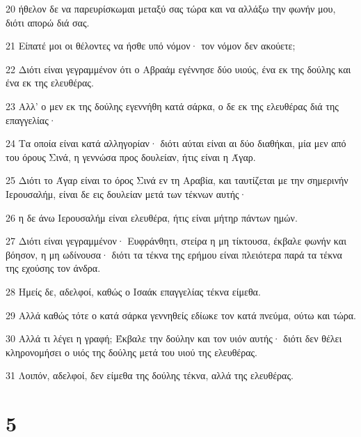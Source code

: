 \par 20 ήθελον δε να παρευρίσκωμαι μεταξύ σας τώρα και να αλλάξω την φωνήν μου, διότι απορώ διά σας.
\par 21 Είπατέ μοι οι θέλοντες να ήσθε υπό νόμον· τον νόμον δεν ακούετε;
\par 22 Διότι είναι γεγραμμένον ότι ο Αβραάμ εγέννησε δύο υιούς, ένα εκ της δούλης και ένα εκ της ελευθέρας.
\par 23 Αλλ' ο μεν εκ της δούλης εγεννήθη κατά σάρκα, ο δε εκ της ελευθέρας διά της επαγγελίας·
\par 24 Τα οποία είναι κατά αλληγορίαν· διότι αύται είναι αι δύο διαθήκαι, μία μεν από του όρους Σινά, η γεννώσα προς δουλείαν, ήτις είναι η Άγαρ.
\par 25 Διότι το Άγαρ είναι το όρος Σινά εν τη Αραβία, και ταυτίζεται με την σημερινήν Ιερουσαλήμ, είναι δε εις δουλείαν μετά των τέκνων αυτής·
\par 26 η δε άνω Ιερουσαλήμ είναι ελευθέρα, ήτις είναι μήτηρ πάντων ημών.
\par 27 Διότι είναι γεγραμμένον· Ευφράνθητι, στείρα η μη τίκτουσα, έκβαλε φωνήν και βόησον, η μη ωδίνουσα· διότι τα τέκνα της ερήμου είναι πλειότερα παρά τα τέκνα της εχούσης τον άνδρα.
\par 28 Ημείς δε, αδελφοί, καθώς ο Ισαάκ επαγγελίας τέκνα είμεθα.
\par 29 Αλλά καθώς τότε ο κατά σάρκα γεννηθείς εδίωκε τον κατά πνεύμα, ούτω και τώρα.
\par 30 Αλλά τι λέγει η γραφή; Έκβαλε την δούλην και τον υιόν αυτής· διότι δεν θέλει κληρονομήσει ο υιός της δούλης μετά του υιού της ελευθέρας.
\par 31 Λοιπόν, αδελφοί, δεν είμεθα της δούλης τέκνα, αλλά της ελευθέρας.

\chapter{5}

